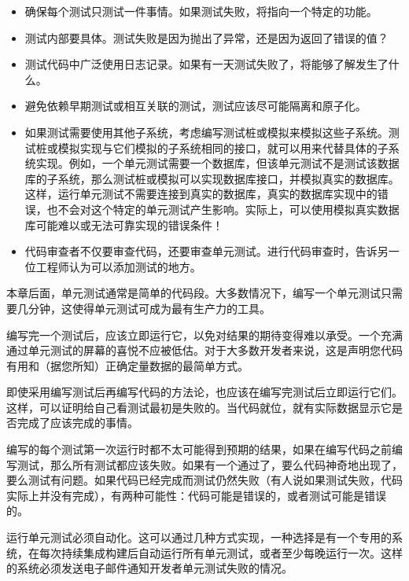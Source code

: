 \begin{itemize}
\item
确保每个测试只测试一件事情。如果测试失败，将指向一个特定的功能。

\item
测试内部要具体。测试失败是因为抛出了异常，还是因为返回了错误的值？

\item
测试代码中广泛使用日志记录。如果有一天测试失败了，将能够了解发生了什么。

\item
避免依赖早期测试或相互关联的测试，测试应该尽可能隔离和原子化。

\item
如果测试需要使用其他子系统，考虑编写测试桩或模拟来模拟这些子系统。测试桩或模拟实现与它们模拟的子系统相同的接口，就可以用来代替具体的子系统实现。例如，一个单元测试需要一个数据库，但该单元测试不是测试该数据库的子系统，那么测试桩或模拟可以实现数据库接口，并模拟真实的数据库。这样，运行单元测试不需要连接到真实的数据库，真实的数据库实现中的错误，也不会对这个特定的单元测试产生影响。实际上，可以使用模拟真实数据库可能难以或无法可靠实现的错误条件！

\item
代码审查者不仅要审查代码，还要审查单元测试。进行代码审查时，告诉另一位工程师认为可以添加测试的地方。
\end{itemize}

本章后面，单元测试通常是简单的代码段。大多数情况下，编写一个单元测试只需要几分钟，这使得单元测试可成为最有生产力的工具。


编写完一个测试后，应该立即运行它，以免对结果的期待变得难以承受。一个充满通过单元测试的屏幕的喜悦不应被低估。对于大多数开发者来说，这是声明您代码有用和（据您所知）正确定量数据的最简单方式。

即使采用编写测试后再编写代码的方法论，也应该在编写完测试后立即运行它们。这样，可以证明给自己看测试最初是失败的。当代码就位，就有实际数据显示它是否完成了应该完成的事情。

编写的每个测试第一次运行时都不太可能得到预期的结果，如果在编写代码之前编写测试，那么所有测试都应该失败。如果有一个通过了，要么代码神奇地出现了，要么测试有问题。如果代码已经完成而测试仍然失败（有人说如果测试失败，代码实际上并没有完成），有两种可能性：代码可能是错误的，或者测试可能是错误的。

运行单元测试必须自动化。这可以通过几种方式实现，一种选择是有一个专用的系统，在每次持续集成构建后自动运行所有单元测试，或者至少每晚运行一次。这样的系统必须发送电子邮件通知开发者单元测试失败的情况。

